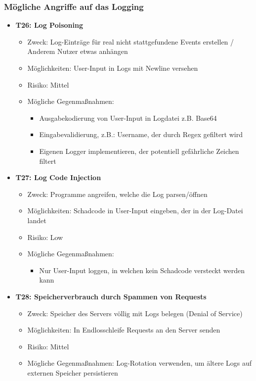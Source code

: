 \documentclass[12pt,DIV14,BCOR10mm,a4paper,parskip=half-,headsepline,headinclude,english,ngerman,bibliography=totocnumbered]{scrreprt}
\begin{document}
\subsubsection{Mögliche Angriffe auf das Logging}

\begin{itemize}

  \hypertarget{threat26}{}
  \item \textbf{T26: Log Poisoning}
  \begin{itemize}
  \item Zweck: Log-Einträge für real nicht stattgefundene Events erstellen / Anderem Nutzer etwas anhängen
  \item Möglichkeiten: User-Input in Logs mit Newline versehen
  \item Risiko: Mittel
  \item Mögliche Gegenmaßnahmen:
  \begin{itemize}
    \item Ausgabekodierung von User-Input in Logdatei z.B. Base64
    \item Eingabevalidierung, z.B.: Username, der durch Regex gefiltert wird
    \item Eigenen Logger implementieren, der potentiell gefährliche Zeichen filtert
  \end{itemize}
  \end{itemize}

  \hypertarget{threat27}{}
  \item \textbf{T27: Log Code Injection}
  \begin{itemize}
  \item Zweck: Programme angreifen, welche die Log parsen/öffnen
  \item Möglichkeiten: Schadcode in User-Input eingeben, der in der Log-Datei landet
  \item Risiko: Low
  \item Mögliche Gegenmaßnahmen:
    \begin{itemize}
      \item Nur User-Input loggen, in welchen kein Schadcode versteckt werden kann
    \end{itemize}
  \end{itemize}

  \hypertarget{threat28}{}
  \item \textbf{T28: Speicherverbrauch durch Spammen von Requests}
  \begin{itemize}
  \item Zweck: Speicher des Servers völlig mit Logs belegen (Denial of Service)
  \item Möglichkeiten: In Endlosschleife Requests an den Server senden
  \item Risiko: Mittel
  \item Mögliche Gegenmaßnahmen: Log-Rotation verwenden, um ältere Logs auf externen Speicher persistieren
  \end{itemize}


\end{itemize}
\end{document}
